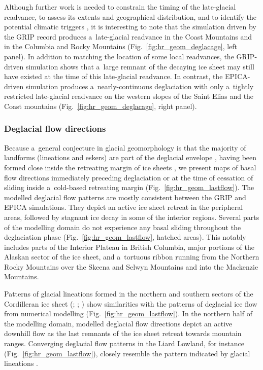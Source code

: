 \documentclass[tc, manuscript]{copernicus}
\begin{document}
      Although further work is needed to constrain the timing of the
      late-glacial readvance, to assess its extents and geographical
      distribution, and to identify the potential climatic triggers
      \citep{Menounos.etal.2008}, it is interesting to note that the
      simulation driven by the GRIP record produces a~late-glacial readvance
      in the Coast Mountains and in the Columbia and Rocky Mountains
      (Fig.~\ref{fig:hr_geom_deglacage}, left panel). In addition to
      matching the location of some local readvances, the GRIP-driven
      simulation shows that a~large remnant of the decaying ice sheet may
      still have existed at the time of this late-glacial readvance. In
      contrast, the EPICA-driven simulation produces a~nearly-continuous
      deglaciation with only a~tightly restricted late-glacial readvance on
      the western slopes of the Saint Elias and the Coast mountains
      (Fig.~\ref{fig:hr_geom_deglacage}, right panel).


\subsubsection{Deglacial flow directions}

      Because a~general conjecture in glacial geomorphology is that the majority
      of landforms (lineations and eskers) are part of the deglacial
      envelope \citep[terminology from][]{Kleman.etal.2006}, having been
      formed close inside the retreating margin of ice sheets
      \citep{Boulton.Clark.1990, Kleman.etal.1997, Kleman.etal.2010}, we
      present maps of basal flow directions immediately preceding
      deglaciation or at the time of cessation of sliding inside
      a~cold-based retreating margin (Fig.~\ref{fig:hr_geom_lastflow}). The
      modelled deglacial flow patterns are mostly consistent between the
      GRIP and EPICA simulations. They depict an active ice sheet retreat in
      the peripheral areas, followed by stagnant ice decay in some of the
      interior regions. Several parts of the modelling domain do not
      experience any basal sliding throughout the deglaciation phase
      (Fig.~\ref{fig:hr_geom_lastflow}, hatched areas). This notably
      includes parts of the Interior Plateau in British Columbia, major
      portions of the Alaskan sector of the ice sheet, and a~tortuous ribbon
      running from the Northern Rocky Mountains over the Skeena and Selwyn
      Mountains and into the Mackenzie Mountains.

      Patterns of glacial lineations formed in the northern and southern
      sectors of the Cordilleran ice sheet (\citealp{Prest.etal.1968};
      \citealp[Fig.~1.12]{Clague.1989}; \citealp[Fig.~2]{Kleman.etal.2010})
      show similarities with the patterns of deglacial ice flow from
      numerical modelling (Fig.~\ref{fig:hr_geom_lastflow}). In the northern
      half of the modelling domain, modelled deglacial flow directions
      depict an active downhill flow as the last remnants of the ice sheet
      retreat towards mountain ranges. Converging deglacial flow patterns in
      the Liard Lowland, for instance (Fig.~\ref{fig:hr_geom_lastflow}),
      closely resemble the pattern indicated by glacial lineations
      \citep[Fig.~2]{Margold.etal.2013}.
\end{document}
